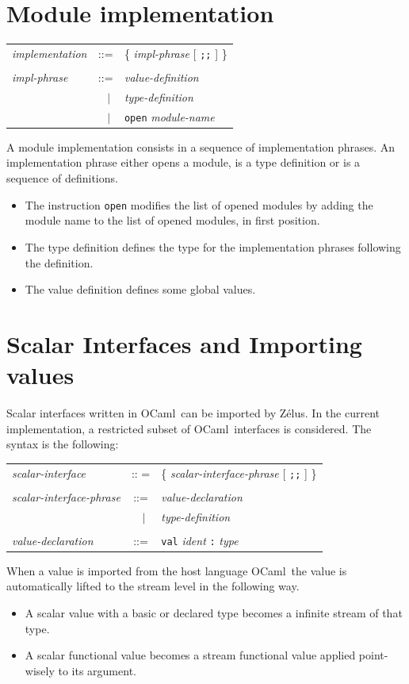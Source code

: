 \documentclass[11pt,titlepage,twoside]{report}
\newcommand{\zelus}{{\sf Z\'elus}}
\newcommand{\ocaml}{{\sf OCaml}}
\newcommand{\alt}{\;|\;}
\newcommand{\Semisemi}{\mbox{{\tt ;;}}}
\newcommand{\term}[1]{{\tt #1}}
\newcommand{\nterm}[1]{{\em #1}}
\begin{document}
\section{Module implementation\label{moduleimpl}} %
\begin{center}
\begin{tabular}{lcl}
\nterm{implementation}
  & ::=        & \{ \nterm{impl-phrase} [ \term{;;} ] \} 
\\ \\
\nterm{impl-phrase}
  & ::=        & \nterm{value-definition} \\ 
  & $\;\;\alt$ & \nterm{type-definition} \\
  & $\;\;\alt$ & \term{open} \nterm{module-name} 
\end{tabular}
\end{center}
A module implementation consists in a sequence of implementation
phrases. An implementation phrase either opens a module, is a type
definition or is a sequence of definitions.
\begin{itemize}
\item The instruction \term{open} modifies the list of opened modules
  by adding the module name to the list of opened modules, in first
  position.
\item The type definition defines the type for the implementation
  phrases following the definition.
\item The value definition defines some global values.
\end{itemize}

\section{Scalar Interfaces and Importing values\label{importing}} %

Scalar interfaces written in \ocaml\ can be imported by \zelus. In the
current implementation, a restricted subset of \ocaml\ interfaces is
considered. The syntax is the following:
\begin{center}
\begin{tabular}{lcl}
\nterm{scalar-interface}
  & :: =   & \{ \nterm{scalar-interface-phrase} [ \term{\Semisemi} ] \} 
\\ \\
\nterm{scalar-interface-phrase}
  & ::=        & \nterm{value-declaration} \\
  & $\;\;\alt$ & \nterm{type-definition}
\\ \\
\nterm{value-declaration}
  & ::=        & \term{val} \nterm{ident} \term{:} \nterm{type}
\end{tabular}
\end{center}
When a value is imported from the host language \ocaml\ the
value is automatically lifted to the stream level in the following way.
\begin{itemize}
\item A scalar value with a basic or declared type becomes a infinite
  stream of that type.
\item A scalar functional value becomes a stream functional value
  applied point-wisely to its argument.
\end{itemize}
\end{document}
